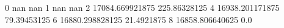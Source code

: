 0 nan nan
1 nan nan
2 17084.669921875 225.86328125
4 16938.201171875 79.39453125
6 16880.298828125 21.4921875
8 16858.806640625 0.0
